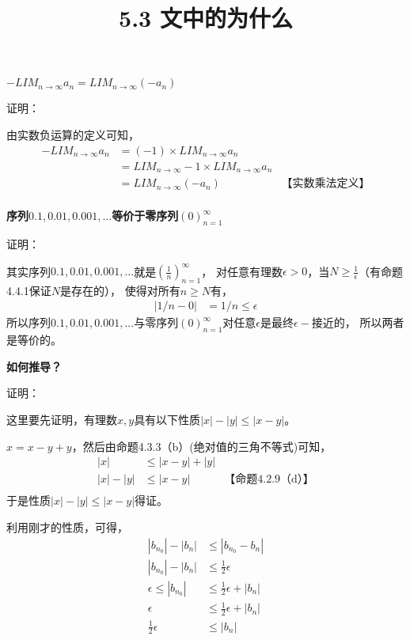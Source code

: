 \documentclass{article}
\theoremstyle{mystyle}
\begin{document}
\title{5.3 文中的为什么}
\maketitle

\textbf{$-LIM_{n \rightarrow \infty}a_n = LIM_{n \rightarrow \infty}(-a_n)$}

证明：

由实数负运算的定义可知，
\begin{align*}
  -LIM_{n \rightarrow \infty}a_n & = (-1) \times LIM_{n \rightarrow \infty}a_n                                           \\
                                 & = LIM_{n \rightarrow \infty}-1 \times LIM_{n \rightarrow \infty}a_n                   \\
                                 & = LIM_{n \rightarrow \infty}(-a_n)                                  & \text{【实数乘法定义】} \\
\end{align*}

\textbf{序列$0.1,0.01,0.001,...$等价于零序列$(0)_{n=1}^\infty$}

证明：

其实序列$0.1,0.01,0.001,...$就是$(\frac{1}{n})_{n=1}^\infty$，
对任意有理数$\epsilon > 0$，当$N \geq \frac{1}{\epsilon}$（有命题4.4.1保证$N$是存在的），
使得对所有$n \geq N$有，
\begin{align*}
  |1/n - 0| & = 1/n \leq \epsilon
\end{align*}
所以序列$0.1,0.01,0.001,...$与零序列$(0)_{n=1}^\infty$对任意$\epsilon$是最终$\epsilon -$接近的，
所以两者是等价的。


\textbf{如何推导？}

证明：

这里要先证明，有理数$x,y$具有以下性质$|x|-|y| \leq |x-y|$。

$x=x-y+y$，然后由命题4.3.3（b）(绝对值的三角不等式)可知，
\begin{align*}
  |x|       & \leq |x-y| + |y|                       \\
  |x| - |y| & \leq |x-y|       & \text{【命题4.2.9（d）】} \\
\end{align*}
于是性质$|x|-|y| \leq |x-y|$得证。

利用刚才的性质，可得，
\begin{align*}
  |b_{n_0}| - |b_{n}|     & \leq |b_{n_0} - b_{n}|             \\
  |b_{n_0}| - |b_{n}|     & \leq \frac{1}{2}\epsilon           \\
  \epsilon \leq |b_{n_0}| & \leq \frac{1}{2}\epsilon + |b_{n}| \\
  \epsilon                & \leq \frac{1}{2}\epsilon + |b_{n}| \\
  \frac{1}{2}\epsilon     & \leq  |b_{n}|
\end{align*}
\end{document}

